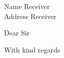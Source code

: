 \documentclass[a4paper,12pt]{letter}
\begin{document}
\setlength{\parindent}{0em}
\pagestyle{empty}

\begin{letter}{Name Receiver \\ Address Receiver}
\signature{NAME}
\address{STREET \\ TOWN}
\opening{Dear Sir}

\closing{With kind regards}
\end{letter}
\end{document}

